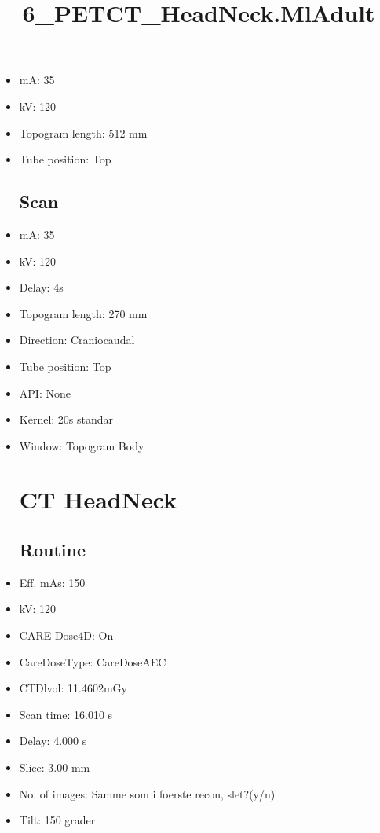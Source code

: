 \documentclass[12pt]{article}
\title{6\_PETCT\_HeadNeck.MlAdult}
\begin{document}
\maketitle
\newpage
\tableofcontents
\newpage
{}


\begin{itemize}\section{Topogram}
\subsection{Routine}
\item mA: 35\item kV: 120\item Topogram length: 512 mm\item Tube position: Top
\subsection{Scan}\item mA: 35\item kV: 120\item Delay: 4s\item Topogram length: 270 mm\item Direction: Craniocaudal\item Tube position: Top\item API: None\item Kernel: 20s standar\item Window: Topogram Body
\section{CT HeadNeck}
\subsection{Routine}
\item Eff. mAs: 150\item kV: 120\item CARE Dose4D: On\item CareDoseType: CareDoseAEC\item CTDlvol: 11.4602mGy\item Scan time: 16.010 s\item Delay: 4.000 s\item Slice: 3.00 mm\item No. of images: Samme som i foerste recon, slet?(y/n)\item Tilt: 150 grader

\end{itemize}
\end{document}
